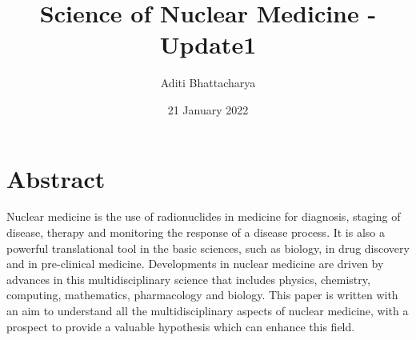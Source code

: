 \documentclass{article}
\title{\textbf{Science of Nuclear Medicine - Update1}}
\author{Aditi Bhattacharya}
\date{21 January 2022}
\begin{document}
\maketitle
\section*{Abstract}
Nuclear medicine is the use of radionuclides in medicine for diagnosis, staging of disease, therapy and monitoring the response of a disease process. It is also a powerful translational tool in the basic sciences, such as biology, in drug discovery and in pre-clinical medicine. Developments in nuclear medicine are driven by advances in this multidisciplinary science that includes physics,
chemistry, computing, mathematics, pharmacology and biology. This paper is written with an aim to understand all the multidisciplinary aspects of nuclear medicine, with a prospect to provide a valuable hypothesis which can enhance this field.
\end{document}
